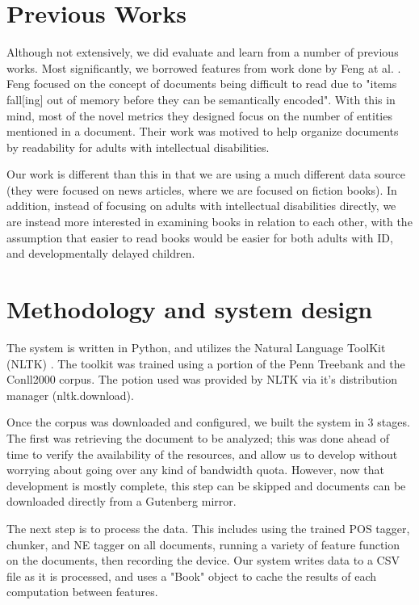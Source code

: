 \documentclass[]{article}
\begin{document}
\section{Previous Works}

Although not extensively, we did evaluate and learn from a number of previous works.
Most significantly, we borrowed features from work done by Feng at al. \cite{feng2009cognitively}.
Feng focused on the concept of documents being difficult to read due to "items fall[ing] out of memory before they can be semantically encoded".
With this in mind, most of the novel metrics they designed focus on the number of entities mentioned in a document.
Their work was motived to help organize documents by readability for adults with intellectual disabilities.

Our work is different than this in that we are using a much different data source (they were focused on news articles, where we are focused on fiction books).
In addition, instead of focusing on adults with intellectual disabilities directly, we are instead more interested in examining books in relation to each other, with the assumption that easier to read books would be easier for both adults with ID, and developmentally delayed children.

\section{Methodology and system design}

The system is written in Python, and utilizes the Natural Language ToolKit (NLTK) \cite{loper2002nltk}.
The toolkit was trained using a portion of the Penn Treebank and the Conll2000 corpus.
The potion used was provided by NLTK via it's distribution manager (nltk.download).

Once the corpus was downloaded and configured, we built the system in 3 stages.
The first was retrieving the document to be analyzed; this was done ahead of time to verify the availability of the resources, and allow us to develop without worrying about going over any kind of bandwidth quota.
However, now that development is mostly complete, this step can be skipped and documents can be downloaded directly from a Gutenberg mirror.

The next step is to process the data.
This includes using the trained POS tagger, chunker, and NE tagger on all documents, running a variety of feature function on the documents, then recording the device.
Our system writes data to a CSV file as it is processed, and uses a "Book" object to cache the results of each computation between features.
\end{document}
